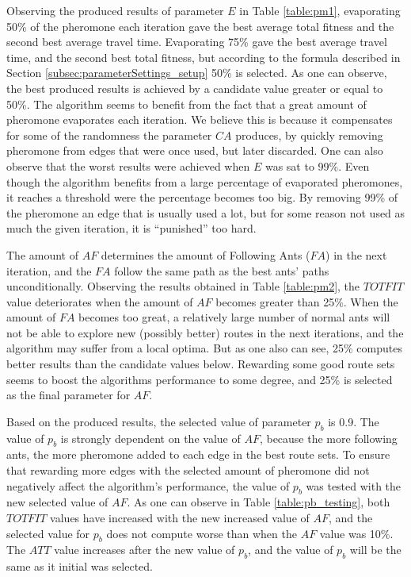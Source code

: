 Observing the produced results of parameter $E$ in Table \vref{table:pm1}, evaporating 50\% of the pheromone each iteration gave the best average total fitness and the second best average travel time. Evaporating 75\% gave the best average travel time, and the second best total fitness, but according to the formula described in Section \vref{subsec:parameterSettings_setup} 50\% is selected. As one can observe, the best produced results is achieved by a candidate value greater or equal to 50\%. The algorithm seems to benefit from the fact that a great amount of pheromone evaporates each iteration. We believe this is because it compensates for some of the randomness the parameter $CA$ produces, by quickly removing pheromone from edges that were once used, but later discarded. One can also observe that the worst results were achieved when $E$ was sat to 99\%. Even though the algorithm benefits from a large percentage of evaporated pheromones, it reaches a threshold were the percentage becomes too big. By removing 99\% of the pheromone an edge that is usually used a lot, but for some reason not used as much the given iteration, it is ``punished'' too hard. 
\newline

The amount of $AF$ determines the amount of Following Ants ($FA$) in the next iteration, and the $FA$ follow the same path as the best ants' paths unconditionally. Observing the results obtained in Table \vref{table:pm2}, the $TOTFIT$ value deteriorates when the amount of $AF$ becomes greater than 25\%. When the amount of $FA$ becomes too great, a relatively large number of normal ants will not be able to explore new (possibly better) routes in the next iterations, and the algorithm may suffer from a local optima. But as one also can see, 25\% computes better results than the candidate values below. Rewarding some good route sets seems to boost the algorithms performance to some degree, and 25\% is selected as the final parameter for $AF$.

Based on the produced results, the selected value of parameter $p_b$ is 0.9. The value of $p_b$ is strongly dependent on the value of $AF$, because the more following ants, the more pheromone added to each edge in the best route sets. To ensure that rewarding more edges with the selected amount of pheromone did not negatively affect the algorithm's performance, the value of $p_b$ was tested with the new selected value of $AF$. As one can observe in Table \vref{table:pb_testing}, both $TOTFIT$ values have increased with the new increased value of $AF$, and the selected value for $p_b$ does not compute worse than when the $AF$ value was 10\%. The $ATT$ value increases after the new value of $p_b$, and the value of $p_b$ will be the same as it initial was selected. 

